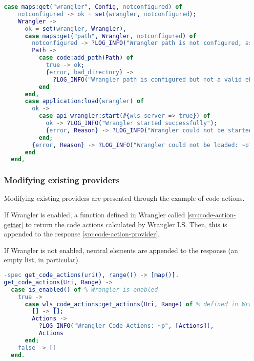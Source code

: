 \begin{lstlisting}[language=erlang]
  case maps:get("wrangler", Config, notconfigured) of
    notconfigured -> ok = set(wrangler, notconfigured);
    Wrangler ->
      ok = set(wrangler, Wrangler),
      case maps:get("path", Wrangler, notconfigured) of
        notconfigured -> ?LOG_INFO("Wrangler path is not configured, assuming it is installed system-wide.");
        Path ->
          case code:add_path(Path) of
            true -> ok;
            {error, bad_directory} ->
              ?LOG_INFO("Wrangler path is configured but not a valid ebin directory: ~p", [Path])
          end
      end,
      case application:load(wrangler) of
        ok ->
          case api_wrangler:start(#{wls_server => true}) of
            ok -> ?LOG_INFO("Wrangler started successfully");
            {error, Reason} -> ?LOG_INFO("Wrangler could not be started: ~p", [Reason])
          end;
        {error, Reason} -> ?LOG_INFO("Wrangler could not be loaded: ~p", [Reason])
      end
  end,

\end{lstlisting}


\subsubsection{Modifying existing providers}

Modifying existing providers are presented through the example of code actions.

If Wrangler is enabled, a function defined in Wrangler called \ref{src:code-action-getter} to return the code actions calculated by Wrangler LS. Then, this is appended to the response \ref{src:code-action-provider}. 

If Wrangler is not enabled, neutral elements are appended to the response (an empty list, in particular).

\begin{lstlisting}[language=erlang]
-spec get_code_actions(uri(), range()) -> [map()].
get_code_actions(Uri, Range) ->
  case is_enabled() of % Wrangler is enabled
    true ->
      case wls_code_actions:get_actions(Uri, Range) of % defined in Wrangler
        [] -> [];
        Actions ->
          ?LOG_INFO("Wrangler Code Actions: ~p", [Actions]),
          Actions
      end;
    false -> []
  end.
\end{lstlisting}

